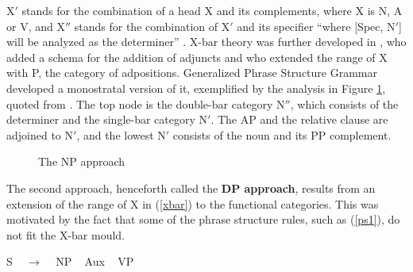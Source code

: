 \documentclass[output=paper]{langsci/langscibook}
\begin{document}
\noindent
X$'$ stands for the combination of a head X and its complements,
where X is N, A or V, and X$''$ stands for the combination of 
X$'$ and its specifier ``where [Spec, N$'$] will be analyzed as the determiner'' 
\citep[52]{Chomsky70}. 
X-bar theory was further developed in \citet{Jackendoff77}, who added a
schema for the addition of adjuncts and who extended the range of 
X with P, the category of adpositions. Generalized Phrase Structure Grammar 
developed a monostratal version of it, exemplified by the analysis 
in Figure \ref{sis}, quoted from \citet[126]{GPSG85}. 
The top node is the double-bar category N$''$, which 
consists of the determiner and the single-bar category N$'$. 
The AP and the relative clause are adjoined to N$'$, and 
the lowest N$'$ consists of the noun and its PP complement.

\begin{figure}
\begin{center}
\footnotesize
{}
\caption{\label{sis} The NP approach} 
\normalsize
\end{center}
\end{figure}
 
The second approach, henceforth called the {\bf DP approach}, results from an
extension of the range of X in (\ref{xbar}) to the functional categories. 
This was motivated by the fact that some of the phrase structure rules, 
such as (\ref{ps1}), do not fit the X-bar mould. 

\begin{exe} 
\ex\label{ps1}   S ~ $\rightarrow$ ~ NP ~ Aux ~ VP
\end{exe}   
\end{document}
